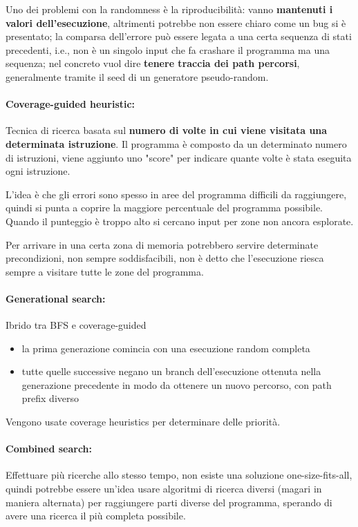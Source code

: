 Uno dei problemi con la randomness è la riproducibilità: vanno \textbf{mantenuti i valori dell'esecuzione}, altrimenti potrebbe non essere chiaro come un bug si è presentato; la comparsa dell'errore può essere legata a una certa sequenza di stati precedenti, i.e., non è un singolo input che fa crashare il programma ma una sequenza; nel concreto vuol dire \textbf{tenere traccia dei path percorsi}, generalmente tramite il seed di  un generatore pseudo-random.

\paragraph{Coverage-guided heuristic:} Tecnica di ricerca basata sul \textbf{numero di volte in cui viene visitata una determinata istruzione}. Il programma è composto da un determinato numero di istruzioni, viene aggiunto uno "score" per indicare quante volte è stata eseguita ogni istruzione. 

L'idea è che gli errori sono spesso in aree del programma difficili da raggiungere, quindi si punta a coprire la maggiore percentuale del programma possibile. Quando il punteggio è troppo alto si cercano input per zone non ancora esplorate.

Per arrivare in una certa zona di memoria potrebbero servire determinate precondizioni, non sempre soddisfacibili, non è detto che l'esecuzione riesca sempre a visitare tutte le zone del programma.

\paragraph{Generational search:} Ibrido tra BFS e coverage-guided
\begin{itemize}
	\item la prima generazione comincia con una esecuzione random completa
	
    \item tutte quelle successive negano un branch dell'esecuzione ottenuta nella generazione precedente in modo da ottenere un nuovo percorso, con path prefix diverso
\end{itemize}

Vengono usate coverage heuristics per determinare delle priorità.

\paragraph{Combined search:} Effettuare più ricerche allo stesso tempo, non esiste una soluzione one-size-fits-all, quindi potrebbe essere un'idea usare algoritmi di ricerca diversi (magari in maniera alternata) per raggiungere parti diverse del programma, sperando di avere una ricerca il più completa possibile.

